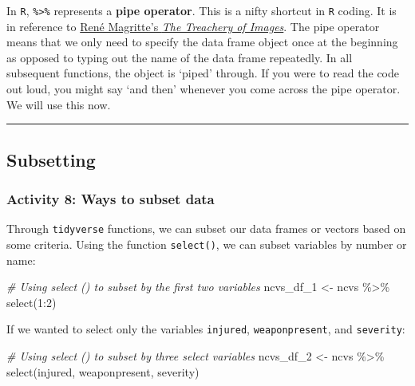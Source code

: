 \documentclass[
]{book}
\newenvironment{Shaded}{\begin{snugshade}}{\end{snugshade}}
\newcommand{\CommentTok}[1]{\textcolor[rgb]{0.56,0.35,0.01}{\textit{#1}}}
\newcommand{\DecValTok}[1]{\textcolor[rgb]{0.00,0.00,0.81}{#1}}
\newcommand{\FunctionTok}[1]{\textcolor[rgb]{0.00,0.00,0.00}{#1}}
\newcommand{\NormalTok}[1]{#1}
\newcommand{\OtherTok}[1]{\textcolor[rgb]{0.56,0.35,0.01}{#1}}
\newcommand{\SpecialCharTok}[1]{\textcolor[rgb]{0.00,0.00,0.00}{#1}}
\begin{document}
In \texttt{R}, \texttt{\%\textgreater{}\%} represents a \textbf{pipe operator}. This is a nifty shortcut in \texttt{R} coding. It is in reference to \href{https://blog.revolutionanalytics.com/2014/07/magrittr-simplifying-r-code-with-pipes.html}{René Magritte's \emph{The Treachery of Images}}. The pipe operator means that we only need to specify the data frame object once at the beginning as opposed to typing out the name of the data frame repeatedly. In all subsequent functions, the object is `piped' through. If you were to read the code out loud, you might say `and then' whenever you come across the pipe operator. We will use this now.

\begin{center}\rule{0.5\linewidth}{0.5pt}\end{center}

\hypertarget{subsetting}{%
\subsection{Subsetting}\label{subsetting}}

\hypertarget{activity-8-ways-to-subset-data}{%
\subsubsection{Activity 8: Ways to subset data}\label{activity-8-ways-to-subset-data}}

Through \texttt{tidyverse} functions, we can subset our data frames or vectors based on some criteria. Using the function \texttt{select()}, we can subset variables by number or name:

\begin{Shaded}
\begin{Highlighting}[]
\CommentTok{\# Using select () to subset by the first two variables}
\NormalTok{ncvs\_df\_1 }\OtherTok{\textless{}{-}}\NormalTok{ ncvs }\SpecialCharTok{\%\textgreater{}\%} \FunctionTok{select}\NormalTok{(}\DecValTok{1}\SpecialCharTok{:}\DecValTok{2}\NormalTok{) }
\end{Highlighting}
\end{Shaded}

If we wanted to select only the variables \texttt{injured}, \texttt{weaponpresent}, and \texttt{severity}:

\begin{Shaded}
\begin{Highlighting}[]
\CommentTok{\# Using select () to subset by three select variables}
\NormalTok{ncvs\_df\_2 }\OtherTok{\textless{}{-}}\NormalTok{ ncvs }\SpecialCharTok{\%\textgreater{}\%} \FunctionTok{select}\NormalTok{(injured, weaponpresent, severity) }
\end{Highlighting}
\end{Shaded}
\end{document}
